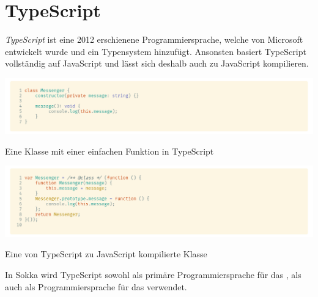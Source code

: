\section{TypeScript}
\label{typescript}

\textit{TypeScript} ist eine 2012 erschienene Programmiersprache, welche von Microsoft entwickelt wurde und \textit{} ein Typensystem hinzufügt. Ansonsten basiert TypeScript vollständig auf JavaScript und lässt sich deshalb auch zu JavaScript kompilieren.

\begin{code}[htp]
    \begin{center}
        \includegraphics[width=1\textwidth]{images/TypeScript/TS.png}
        \vspace{-25pt}
        \caption{Eine Klasse mit einer einfachen Funktion in TypeScript}
    \end{center}
\end{code}

\begin{code}[htp]
    \begin{center}
        \includegraphics[width=1\textwidth]{images/TypeScript/JS.png}
        \vspace{-25pt}
        \caption{Eine von TypeScript zu JavaScript kompilierte Klasse}
    \end{center}
\end{code}

In Sokka wird TypeScript sowohl als primäre Programmiersprache für das , als auch als Programmiersprache für das  verwendet.